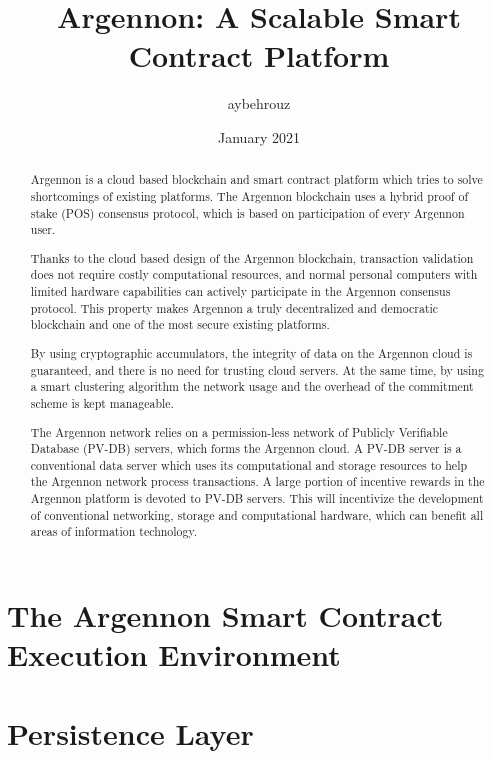 \documentclass[11pt, a4paper]{report}
\title{Argennon: A Scalable Smart Contract Platform}
\author{aybehrouz}
\date{January 2021}
\begin{document}
    \maketitle
    \begin{abstract}
        Argennon is a cloud based blockchain and smart
        contract platform which tries to solve shortcomings of existing platforms. The Argennon blockchain uses a hybrid
        proof of stake (POS) consensus protocol, which is based on participation of every Argennon user.

        Thanks to the
        cloud based design of the Argennon blockchain, transaction validation does not require costly computational
        resources, and normal personal computers with limited hardware capabilities can actively participate in the
        Argennon consensus protocol. This property makes Argennon a truly decentralized and democratic blockchain and
        one of the most secure existing platforms.

        By using cryptographic accumulators, the integrity of data on the Argennon cloud is guaranteed, and there
        is no need for trusting cloud servers. At the same time, by using a smart clustering algorithm the network usage
        and the overhead of the commitment scheme is kept manageable.

        The Argennon network relies on a permission-less network of Publicly Verifiable Database (PV-DB) servers,
        which forms the Argennon cloud. A PV-DB server is a conventional data server which uses its computational and
        storage resources to help the
        Argennon network process transactions. A large portion of incentive rewards in the Argennon platform is
        devoted to PV-DB servers. This will incentivize the development of conventional networking, storage and
        computational hardware, which can benefit all areas of information technology.
    \end{abstract}
    \tableofcontents


    \chapter{The Argennon Smart Contract Execution Environment}\label{ch:AVM}
    


    \chapter{Persistence Layer}\label{ch:persistance}
    
\end{document}
